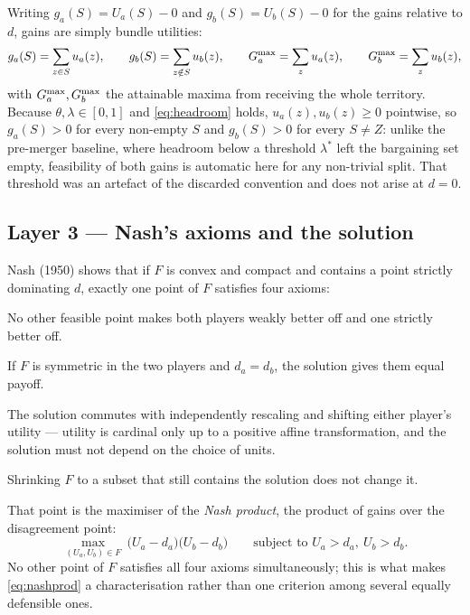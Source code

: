 \documentclass[11pt]{article}
\theoremstyle{remark}\newtheorem*{remark}{Remark}
\begin{document}
Writing $g_a(S)=U_a(S)-0$ and $g_b(S)=U_b(S)-0$ for the gains relative to $d$, gains are
simply bundle utilities:
\begin{equation}\label{eq:gains}
g_a(S)=\sum_{z\in S}u_a(z),\qquad g_b(S)=\sum_{z\notin S}u_b(z),\qquad
G_a^{\max}=\sum_zu_a(z),\qquad G_b^{\max}=\sum_zu_b(z),
\end{equation}
with $G_a^{\max},G_b^{\max}$ the attainable maxima from receiving the whole territory. Because
$\theta,\lambda\in[0,1]$ and \eqref{eq:headroom} holds, $u_a(z),u_b(z)\ge0$ pointwise, so
$g_a(S)>0$ for every non-empty $S$ and $g_b(S)>0$ for every $S\ne Z$: unlike the
pre-merger baseline, where headroom below a threshold $\lambda^\ast$ left the bargaining
set empty, feasibility of both gains is automatic here for any non-trivial split. That
threshold was an artefact of the discarded convention and does not arise at $d=0$.

\subsection{Layer 3 --- Nash's axioms and the solution}
Nash (1950) shows that if $F$ is convex and compact and contains a point strictly
dominating $d$, exactly one point of $F$ satisfies four axioms:
\begin{description}[leftmargin=1.6em,itemsep=1pt]
\item[Pareto optimality.] No other feasible point makes both players weakly better off
  and one strictly better off.
\item[Symmetry.] If $F$ is symmetric in the two players and $d_a=d_b$, the solution gives
  them equal payoff.
\item[Invariance to affine transformations.] The solution commutes with independently
  rescaling and shifting either player's utility --- utility is cardinal only up to a
  positive affine transformation, and the solution must not depend on the choice of
  units.
\item[Independence of irrelevant alternatives.] Shrinking $F$ to a subset that still
  contains the solution does not change it.
\end{description}
That point is the maximiser of the \emph{Nash product}, the product of gains over the
disagreement point:
\begin{equation}\label{eq:nashprod}
\max_{(U_a,U_b)\in F}\ \bigl(U_a-d_a\bigr)\bigl(U_b-d_b\bigr)
\qquad\text{subject to } U_a>d_a,\ U_b>d_b .
\end{equation}
No other point of $F$ satisfies all four axioms simultaneously; this is what makes
\eqref{eq:nashprod} a characterisation rather than one criterion among several equally
defensible ones.
\end{document}
